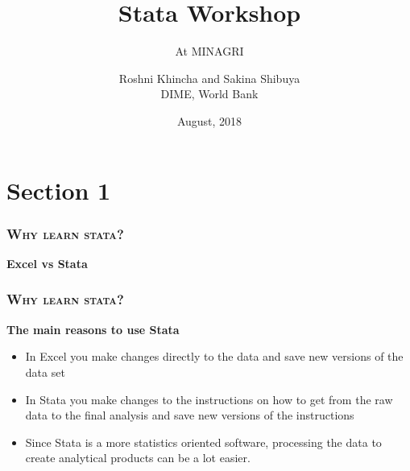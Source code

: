 \documentclass[10pt]{beamer}
\title{Stata Workshop} %
\subtitle{At MINAGRI} %
\author{Roshni Khincha and Sakina Shibuya \\ DIME, World Bank}
\date{August, 2018}
\begin{document}
		
	\maketitle

	\section{Section 1}

		\begin{frame}
		
			\frametitle{\textsc{Why learn stata?}}
			\begin{center}
				\textbf{Excel vs Stata} \\ 
			\end{center}
		
		\end{frame}

		
		\begin{frame}
			\frametitle{\textsc{Why learn stata?}}
			\begin{center}
				\Large\textbf{The main reasons to use Stata}
			\end{center}
			\begin{itemize}
				\item In Excel you make changes directly to the data and save new versions of the data set
			
				\item In Stata you make changes to the instructions on how to get from the raw data to the final analysis and save new versions of the instructions
			
				\item Since Stata is a more statistics oriented software, processing the data to create analytical products can be a lot easier. 
			
			\end{itemize}
		\end{frame}
\end{document}
